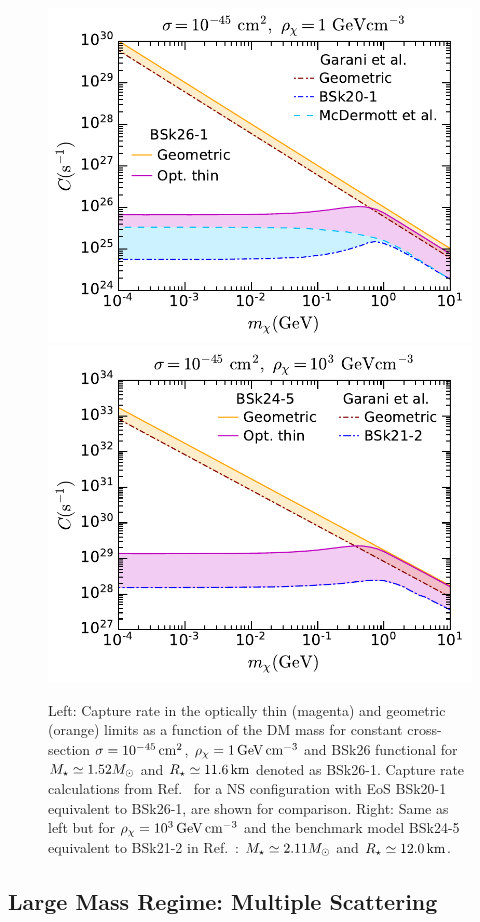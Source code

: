 \begin{figure}
    \centering
    \includegraphics[width=.48\textwidth]{capture_1/capture_rate_n0_comp1.pdf}
    \includegraphics[width=.48\textwidth]{capture_1/capture_rate_n0_comp2.pdf}    
    \caption[Capture rate in the optically thin  (magenta) and geometric (orange) limits as a function of the DM mass for constant cross-section $\sigma=10^{-45}\cm^2$, $\rho_\chi=1\GeV\cm^{-3}$ and BSk26 functional for $\Mstar\simeq1.52\Msun$ and $\Rstar\simeq11.6\km$ denoted as BSk26-1.]{Left: Capture rate in the optically thin  (magenta) and geometric (orange) limits as a function of the DM mass for constant cross-section $\sigma=10^{-45}\cm^2$, $\rho_\chi=1\GeV\cm^{-3}$ and BSk26 functional for $\Mstar\simeq1.52\Msun$ and $\Rstar\simeq11.6\km$ denoted as BSk26-1. Capture rate calculations from Ref.~\cite{Garani:2018kkd_may_NewAnalysisNeutron} for a NS configuration with EoS BSk20-1~\cite{Potekhin:2013qqa_Analyticalrepresentationsunified} equivalent to BSk26-1, are shown for comparison. Right: Same as left but for $\rho_\chi=10^3{\rm \,GeV}{\rm \,cm}^{-3}$ and the benchmark model BSk24-5 equivalent to BSk21-2 in Ref.~\cite{Garani:2018kkd_may_NewAnalysisNeutron}: $M_\star\simeq2.11M_\odot$ and $R_\star\simeq12.0{\rm \,km}$. 
    }
    \label{ch3:fig:Cratecomp}
\end{figure}

\subsection{Large Mass Regime: Multiple Scattering}
\label{ch3:subsec:largemassandsigma}


